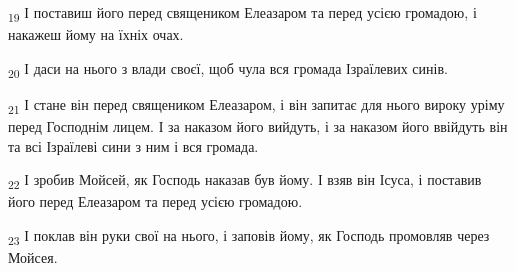 \begin{tcolorbox}
\textsubscript{19} І поставиш його перед священиком Елеазаром та перед усією громадою, і накажеш йому на їхніх очах.
\end{tcolorbox}
\begin{tcolorbox}
\textsubscript{20} І даси на нього з влади своєї, щоб чула вся громада Ізраїлевих синів.
\end{tcolorbox}
\begin{tcolorbox}
\textsubscript{21} І стане він перед священиком Елеазаром, і він запитає для нього вироку уріму перед Господнім лицем. І за наказом його вийдуть, і за наказом його ввійдуть він та всі Ізраїлеві сини з ним і вся громада.
\end{tcolorbox}
\begin{tcolorbox}
\textsubscript{22} І зробив Мойсей, як Господь наказав був йому. І взяв він Ісуса, і поставив його перед Елеазаром та перед усією громадою.
\end{tcolorbox}
\begin{tcolorbox}
\textsubscript{23} І поклав він руки свої на нього, і заповів йому, як Господь промовляв через Мойсея.
\end{tcolorbox}
